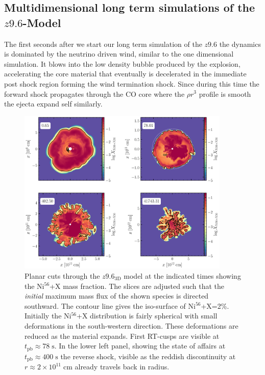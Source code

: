 \documentclass[fleqn,usenatbib]{mnras}
\newcommand{\nickel}{$\mathrm{Ni^{56}}$\xspace}
\newcommand{\tracer}{$\mathrm{X}$\xspace}
\begin{document}
\subsection{Multidimensional long term simulations of the $z9.6$-Model}
\label{subsec:muldidimensional longterm z9}
The first seconds after we start our long term simulation of the $z9.6$ the dynamics is dominated by the neutrino driven wind, similar to the one dimensional simulation. It blows into the low density bubble produced by the explosion, accelerating the core material that eventually is decelerated in the immediate post shock region forming the wind termination shock. 
Since during this time the forward shock propagates through the CO core where the $\rho r^3$ profile is smooth the ejecta expand self similarly. 

\begin{figure}
 \centering
 \includegraphics[width=0.9\textwidth]{pic/species_cuts_z9_3d_4times.pdf}
 \caption{Planar cuts through the $z9.6_{\mathrm{3D}}$ model at the indicated times showing the \nickel+\tracer mass fraction. The slices are adjusted such that the \textit{initial} maximum mass flux of the shown species is directed southward. The contour line gives the iso-surface of \nickel+\tracer=2\%. Initially the \nickel+\tracer distribution is fairly spherical with small deformations in the south-western direction. These deformations are reduced as the material expands. First RT-cusps are visible at $t_{\mathrm{pb}}\approx 78\;\mathrm{s}$. In the lower left panel, showing the state of affairs at  $t_{\mathrm{pb}}\approx 400\;\mathrm{s}$ the reverse shock, visible as the reddish discontinuity at $r\approx 2\times 10^{11}\;\mathrm{cm}$ already travels back in radius. }
 \label{fig:z9_3d_species_4times}
\end{figure}
\end{document}

